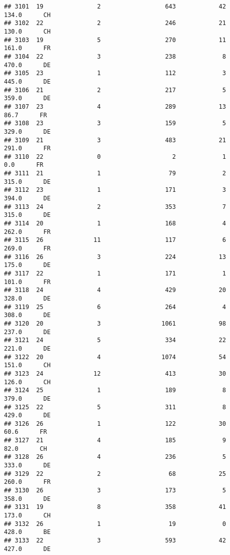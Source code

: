 \documentclass[
]{article}
\begin{document}
\begin{verbatim}
## 3101  19               2                  643            42    134.0      CH
## 3102  22               2                  246            21    130.0      CH
## 3103  19               5                  270            11    161.0      FR
## 3104  22               3                  238             8    470.0      DE
## 3105  23               1                  112             3    445.0      DE
## 3106  21               2                  217             5    359.0      DE
## 3107  23               4                  289            13     86.7      FR
## 3108  23               3                  159             5    329.0      DE
## 3109  21               3                  483            21    291.0      FR
## 3110  22               0                    2             1      0.0      FR
## 3111  21               1                   79             2    315.0      DE
## 3112  23               1                  171             3    394.0      DE
## 3113  24               2                  353             7    315.0      DE
## 3114  20               1                  168             4    262.0      FR
## 3115  26              11                  117             6    269.0      FR
## 3116  26               3                  224            13    175.0      DE
## 3117  22               1                  171             1    101.0      FR
## 3118  24               4                  429            20    328.0      DE
## 3119  25               6                  264             4    308.0      DE
## 3120  20               3                 1061            98    237.0      DE
## 3121  24               5                  334            22    221.0      DE
## 3122  20               4                 1074            54    151.0      CH
## 3123  24              12                  413            30    126.0      CH
## 3124  25               1                  189             8    379.0      DE
## 3125  22               5                  311             8    429.0      DE
## 3126  26               1                  122            30     60.6      FR
## 3127  21               4                  185             9     82.0      CH
## 3128  26               4                  236             5    333.0      DE
## 3129  22               2                   68            25    260.0      FR
## 3130  26               3                  173             5    358.0      DE
## 3131  19               8                  358            41    173.0      CH
## 3132  26               1                   19             0    428.0      BE
## 3133  22               3                  593            42    427.0      DE

\end{verbatim}
\end{document}
